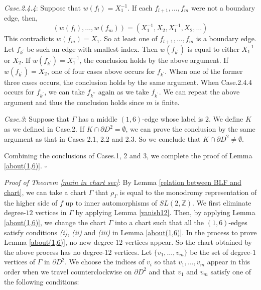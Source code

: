 \documentclass{amsart}
\theoremstyle{plain}
\theoremstyle{definition}
\begin{document}
{\it Case.2.4.4}: Suppose that $w(f_l)=X_1^{-1}$. 
If each $f_{l+1},\ldots,f_{m}$ were not a boundary edge, then, 
\[
(w(f_{l}),\ldots,w(f_{m}))=(X_1^{-1},X_2,X_1^{-1},X_2,\ldots)
\]
This contradicts $w(f_m)=X_1$. 
So at least one of $f_{l+1},\ldots,f_{m}$ is a boundary edge. 
Let $f_{k^\prime}$ be such an edge with smallest index. 
Then $w(f_{k^\prime})$ is equal to either $X_1^{-1}$ or $X_2$. 
If $w(f_{k^\prime})=X_1^{-1}$, the conclusion holds by the above argument. 
If $w(f_{k^\prime})=X_2$, one of four cases above occurs for $f_{k^\prime}$. 
When one of the former three cases occurs, the conclusion holds by the same argument. 
When Case.2.4.4 occurs for $f_{k^\prime}$, we can take $f_{k^{\prime\prime}}$ again as we take $f_{k^\prime}$. 
We can repeat the above argument and thus the conclusion holds since $m$ is finite. 

\par

{\it Case.3}: Suppose that $\Gamma$ has a middle $(1,6)$-edge whose label is $2$. 
We define $K$ as we defined in Case.2. 
If $K\cap\partial D^2=\emptyset$, we can prove the conclusion by the same argument as that in Cases 2.1, 2.2 and 2.3. 
So we conclude that $K\cap\partial D^2\neq\emptyset$. 

\par

Combining the conclusions of Cases.1, 2 and 3, we complete the proof of Lemma \ref{about(1,6)}.  \hfill $\square$
\\
\par

{\it Proof of Theorem \ref{main in chart sec}}: 
By Lemma \ref{relation between BLF and chart}, 
we can take a chart $\Gamma$ that $\rho_\Gamma$ is equal to the monodromy representation of the higher side of $f$ up to inner automorphisms of $SL(2,\mathbb{Z})$. 
We first eliminate degree-$12$ vertices in $\Gamma$ by applying Lemma \ref{vanish12}. 
Then, by applying Lemma \ref{about(1,6)}, we change the chart $\Gamma$ into a chart such that 
all the $(1,6)$-edges satisfy conditions {\it (i)}, {\it (ii)} and {\it (iii)} in Lemma \ref{about(1,6)}. 
In the process to prove Lemma \ref{about(1,6)}, no new degree-$12$ vertices appear. 
So the chart obtained by the above process has no degree-$12$ vertices. 
Let $\{v_1,\ldots,v_m\}$ be the set of degree-$1$ vertices of $\Gamma$ in $\partial D^2$. 
We choose the indices of $v_i$ so that $v_1,\ldots,v_m$ appear in this order when we travel counterclockwise on $\partial D^2$ 
and that $v_1$ and $v_m$ satisfy one of the following conditions: 
\end{document}

